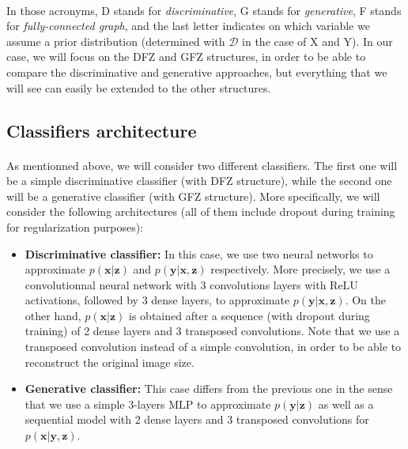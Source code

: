\documentclass[11pt,twocolumn,letterpaper]{article}
\begin{document}
\paragraph{} In those acronyms, D stands for \textit{discriminative}, G stands for \textit{generative}, F stands for \textit{fully-connected graph}, and the last letter indicates on which variable we assume a prior distribution (determined with $\mathcal{D}$ in the case of X and Y). In our case, we will focus on the DFZ and GFZ structures, in order to be able to compare the discriminative and generative approaches, but everything that we will see can easily be extended to the other structures.

\subsection{Classifiers architecture}

\paragraph{} As mentionned above, we will consider two different classifiers. The first one will be a simple discriminative classifier (with DFZ structure), while the second one will be a generative classifier (with GFZ structure). More specifically, we will consider the following architectures (all of them include dropout during training for regularization purposes):

\begin{itemize}
    \item \textbf{Discriminative classifier:} In this case, we use two neural networks to approximate $p(\bm{x}|\bm{z})$ and $p(\bm{y}|\bm{x}, \bm{z})$ respectively. More precisely, we use a convolutionnal neural network with 3 convolutions layers with ReLU activations, followed by 3 dense layers, to approximate $p(\bm{y}|\bm{x}, \bm{z})$. On the other hand, $p(\bm{x}|\bm{z})$ is obtained after a sequence (with dropout during training) of 2 dense layers and 3 transposed convolutions. Note that we use a transposed convolution instead of a simple convolution, in order to be able to reconstruct the original image size. 
    \item \textbf{Generative classifier:} This case differs from the previous one in the sense that we use a simple 3-layers MLP to approximate $p(\bm{y}|\bm{z})$ as well as a sequential model with 2 dense layers and 3 transposed convolutions for $p(\bm{x}|\bm{y}, \bm{z})$.
\end{itemize}
\end{document}
